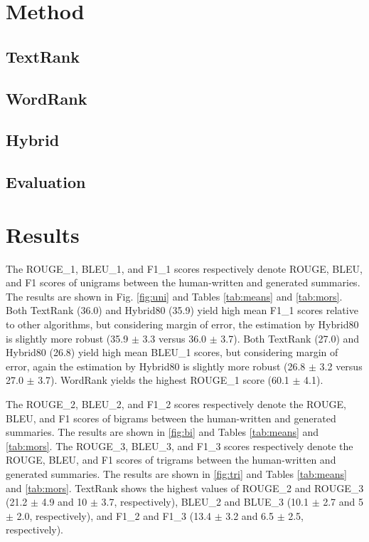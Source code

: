 \documentclass[11pt]{article}
\begin{document}
\section{Method}
\subsection{TextRank}
\subsection{WordRank}
\subsection{Hybrid}
\subsection{Evaluation}

\section{Results}

The ROUGE\_1, BLEU\_1, and F1\_1 scores respectively denote ROUGE, BLEU, and F1 scores of unigrams between the human-written and generated summaries. The results are shown in Fig. \ref{fig:uni} and Tables \ref{tab:means} and \ref{tab:mors}. Both TextRank (36.0) and Hybrid80 (35.9) yield high mean F1\_1 scores relative to other algorithms, but considering margin of error, the estimation by Hybrid80 is slightly more robust (35.9 $\pm$ 3.3 versus 36.0 $\pm$ 3.7). Both TextRank (27.0) and Hybrid80 (26.8) yield high mean BLEU\_1 scores, but considering margin of error, again the estimation by Hybrid80 is slightly more robust (26.8 $\pm$ 3.2 versus 27.0 $\pm$ 3.7). WordRank yields the highest ROUGE\_1 score (60.1 $\pm$ 4.1). 

The ROUGE\_2, BLEU\_2, and F1\_2 scores respectively denote the ROUGE, BLEU, and F1 scores of bigrams between the human-written and generated summaries. The results are shown in \ref{fig:bi} and Tables \ref{tab:means} and \ref{tab:mors}. The ROUGE\_3, BLEU\_3, and F1\_3 scores respectively denote the ROUGE, BLEU, and F1 scores of trigrams between the human-written and generated summaries. The results are shown in \ref{fig:tri} and Tables \ref{tab:means} and \ref{tab:mors}. TextRank shows the highest values of ROUGE\_2 and ROUGE\_3 (21.2 $\pm$ 4.9 and 10 $\pm$ 3.7, respectively), BLEU\_2 and BLUE\_3 (10.1 $\pm$ 2.7 and 5 $\pm$ 2.0, respectively), and F1\_2 and F1\_3 (13.4 $\pm$ 3.2 and 6.5 $\pm$ 2.5, respectively).
\end{document}

